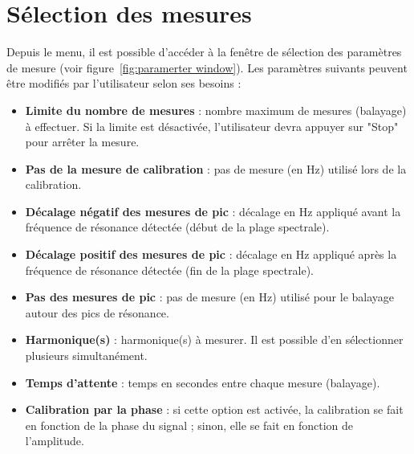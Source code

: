 \section{Sélection des mesures}

Depuis le menu, il est possible d'accéder à la fenêtre de sélection des paramètres de mesure (voir figure~\ref{fig:paramerter window}).  
Les paramètres suivants peuvent être modifiés par l'utilisateur selon ses besoins :

\begin{itemize}[label=\textbullet]
    \item \textbf{Limite du nombre de mesures} : nombre maximum de mesures (balayage) à effectuer. Si la limite est désactivée, l'utilisateur devra appuyer sur "Stop" pour arrêter la mesure.
    
    \item \textbf{Pas de la mesure de calibration} : pas de mesure (en Hz) utilisé lors de la calibration.
    
    \item \textbf{Décalage négatif des mesures de pic} : décalage en Hz appliqué avant la fréquence de résonance détectée (début de la plage spectrale).
    
    \item \textbf{Décalage positif des mesures de pic} : décalage en Hz appliqué après la fréquence de résonance détectée (fin de la plage spectrale).
    
    \item \textbf{Pas des mesures de pic} : pas de mesure (en Hz) utilisé pour le balayage autour des pics de résonance.
    
    \item \textbf{Harmonique(s)} : harmonique(s) à mesurer. Il est possible d'en sélectionner plusieurs simultanément.

    \item \textbf{Temps d'attente} : temps en secondes entre chaque mesure (balayage).

    \item \textbf{Calibration par la phase} : si cette option est activée, la calibration se fait en fonction de la phase du signal ; sinon, elle se fait en fonction de l'amplitude.
\end{itemize}

